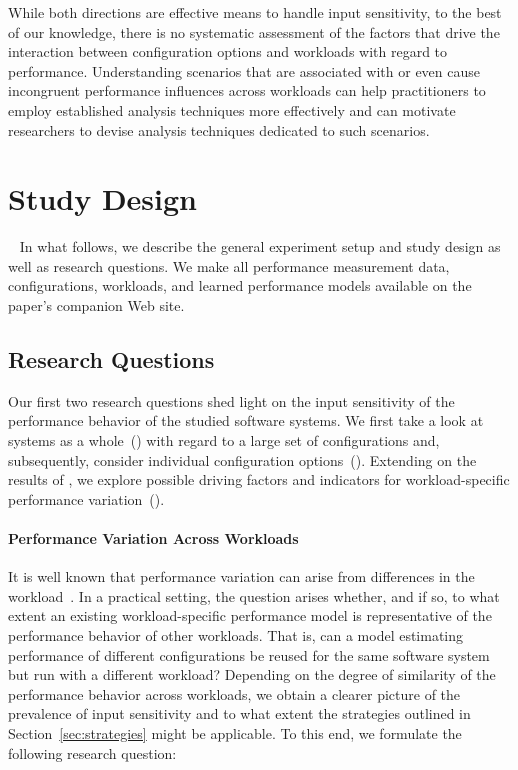 While both directions are effective means to handle input sensitivity, to the best of our knowledge, there is no systematic assessment of the factors that drive the interaction between configuration options and workloads with regard to performance. Understanding scenarios that are associated with or even cause incongruent performance influences across workloads can help practitioners to employ established analysis techniques more effectively and can motivate researchers to devise analysis techniques dedicated to such scenarios.

\section{Study Design}~\label{sec:study}
In what follows, we describe the general experiment setup and study design as well as research questions. We make all performance measurement data, configurations, workloads, and learned performance models available on the paper's companion Web site.

\subsection{Research Questions}
Our first two research questions shed light on the input sensitivity of the performance behavior of the studied software systems. We first take a look at systems as a whole~() with regard to a large set of configurations and, subsequently, consider individual configuration options~(). Extending on the results of , we explore possible driving factors and indicators for workload-specific performance variation~().

\paragraph{Performance Variation Across Workloads}
It is well known that performance variation can arise from differences in the workload~\cite{benchmarking_book}. In a practical setting, the question arises whether, and if so, to what extent an existing workload-specific performance model is representative of the performance behavior of other workloads. 
That is, can a model estimating performance of different configurations be reused for the same software system but run with a different workload? Depending on the degree of similarity of the performance behavior across workloads, we obtain a clearer picture of the prevalence of input sensitivity and to what extent the strategies outlined in  Section~\ref{sec:strategies} might be applicable.
To this end, we formulate the following research question: 

